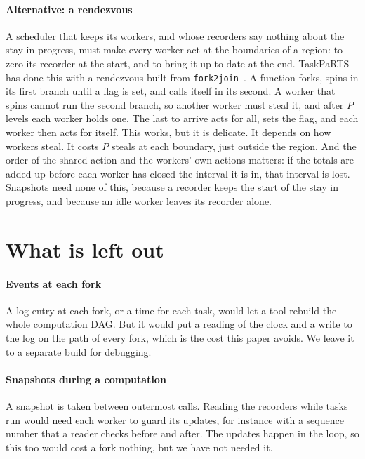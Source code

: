 \documentclass[sigplan,nonacm]{acmart}
\begin{document}
\paragraph{Alternative: a rendezvous}
%
A scheduler that keeps its workers, and whose recorders say nothing
about the stay in progress, must make every worker act at the
boundaries of a region: to zero its recorder at the start, and to
bring it up to date at the end.
%
TaskPaRTS has done this with a rendezvous built from
\lstinline|fork2join|~\cite{taskparts}.
%
A function forks, spins in its first branch until a flag is set, and
calls itself in its second.
%
A worker that spins cannot run the second branch, so another worker
must steal it, and after $P$ levels each worker holds one.
%
The last to arrive acts for all, sets the flag, and each worker then
acts for itself.
%
This works, but it is delicate.
%
It depends on how workers steal.
%
It costs $P$ steals at each boundary, just outside the region.
%
And the order of the shared action and the workers' own actions
matters: if the totals are added up before each worker has closed the
interval it is in, that interval is lost.
%
Snapshots need none of this, because a recorder keeps the start of
the stay in progress, and because an idle worker leaves its recorder
alone.

\section{What is left out}
\label{sec:limits}

\paragraph{Events at each fork}
%
A log entry at each fork, or a time for each task, would let a tool
rebuild the whole computation DAG.
%
But it would put a reading of the clock and a write to the log on the
path of every fork, which is the cost this paper avoids.
%
We leave it to a separate build for debugging.

\paragraph{Snapshots during a computation}
%
A snapshot is taken between outermost calls.
%
Reading the recorders while tasks run would need each worker to guard
its updates, for instance with a sequence number that a reader checks
before and after.
%
The updates happen in the loop, so this too would cost a fork
nothing, but we have not needed it.
\end{document}
